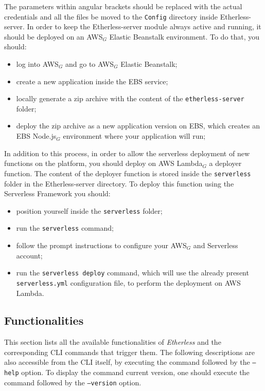 The parameters within angular brackets should be replaced with the actual credentials and all the files be moved to the \texttt{Config} directory inside Etherless-server.
	In order to keep the Etherless-server module always active and running, it should be deployed on an AWS$_{G}$ Elastic Beanstalk environment. To do that, you should:
	\begin{itemize}
		\item log into AWS$_{G}$ and go to AWS$_{G}$ Elastic Beanstalk;
		\item create a new application inside the EBS service;
		\item locally generate a zip archive with the content of the \texttt{etherless-server} folder;
		\item deploy the zip archive as a new application version on EBS, which creates an EBS Node.js$_{G}$ environment where your application will run;
	\end{itemize}
	In addition to this process, in order to allow the serverless deployment of new functions on the platform, you should deploy on AWS Lambda$_{G}$ a deployer function. The content of the deployer function is stored inside the \texttt{serverless} folder in the Etherless-server directory. To deploy this function using the Serverless Framework you should:
	\begin{itemize}
		\item position yourself inside the \texttt{serverless} folder;
		\item run the \texttt{serverless} command;
		\item follow the prompt instructions to configure your AWS$_{G}$ and Serverless account;
		\item run the \texttt{serverless deploy} command, which will use the already present \texttt{serverless.yml} configuration file, to perform the deployment on AWS Lambda.
	\end{itemize}

\subsection{Functionalities}
	This section lists all the available functionalities of \textit{Etherless} and the corresponding CLI commands that trigger them. The following descriptions are also accessible from the CLI itself, by executing the command followed by the \texttt{---help} option. To display the command current version, one should execute the command followed by the \texttt{---version} option.
